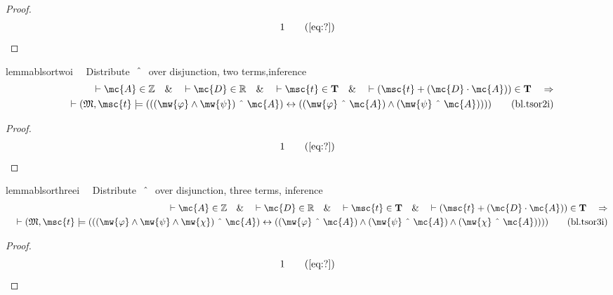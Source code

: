 \begin{proof}
\begin{align}
  1 &&  & &(\mbox{\ref{eq:?}})\notag
\end{align}
\end{proof}

\begin{restatable}{lemma}{blsortwoi}~~ Distribute $~\string^~$ over disjunction,
two terms,inference
\begin{align}
\vdash \mc{A} \in \mathbb{Z}\quad\&\quad \vdash \mc{D} \in
    \mathbb{R}\quad\&\quad \vdash \msc{t} \in \mathbf{T}\quad\&\quad \vdash (
    \msc{t} + ( \mc{D} \cdot \mc{A} ) ) \in \mathbf{T}\quad\Rightarrow \notag \\ 
	\quad
    \vdash ( \mathfrak{M} , \msc{t} \models ( ( ( \mw{\varphi} \wedge \mw{\psi}
    ) ~\string^~ \mc{A} ) \leftrightarrow ( ( \mw{\varphi} ~\string^~ \mc{A} )
    \wedge ( \mw{\psi} ~\string^~ \mc{A} ) ) )
    )\label{eq:bl.tsor2i}\tag{bl.tsor2i}
\end{align}
\end{restatable}

\begin{proof}
\begin{align}
  1 &&  & &(\mbox{\ref{eq:?}})\notag
\end{align}
\end{proof}

\begin{restatable}{lemma}{blsorthreei}~~ Distribute $~\string^~$ over disjunction,
three terms, inference
\begin{align}
\vdash \mc{A} \in \mathbb{Z}\quad\&\quad \vdash \mc{D} \in
    \mathbb{R}\quad\&\quad \vdash \msc{t} \in \mathbf{T}\quad\&\quad \vdash (
    \msc{t} + ( \mc{D} \cdot \mc{A} ) ) \in \mathbf{T}\quad\Rightarrow \notag \\ 
	\quad
    \vdash ( \mathfrak{M} , \msc{t} \models ( ( ( \mw{\varphi} \wedge \mw{\psi}
    \wedge \mw{\chi} ) ~\string^~ \mc{A} ) \leftrightarrow ( ( \mw{\varphi}
    ~\string^~ \mc{A} ) \wedge ( \mw{\psi} ~\string^~ \mc{A} ) \wedge (
    \mw{\chi} ~\string^~ \mc{A} ) ) ) )\label{eq:bl.tsor3i}\tag{bl.tsor3i}
\end{align}
\end{restatable}

\begin{proof}
\begin{align}
  1 &&  & &(\mbox{\ref{eq:?}})\notag
\end{align}
\end{proof}

